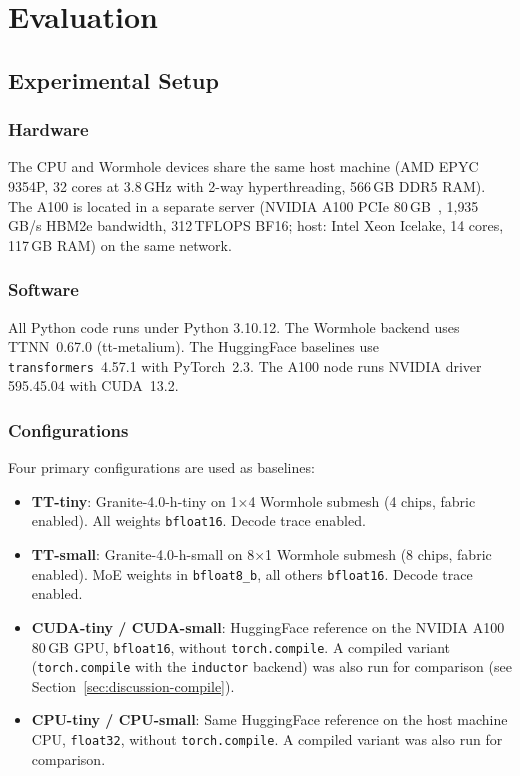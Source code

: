 \section{Evaluation}

\subsection{Experimental Setup}

\subsubsection{Hardware}

The CPU and Wormhole devices share the same host machine (AMD EPYC 9354P, 32 cores at 3.8\,GHz with 2-way hyperthreading, 566\,GB DDR5 RAM). The A100 is located in a separate server (NVIDIA A100 PCIe 80\,GB~\citep{nvidia2020a100}, 1{,}935\,GB/s HBM2e bandwidth, 312\,TFLOPS BF16; host: Intel Xeon Icelake, 14 cores, 117\,GB RAM) on the same network.

\subsubsection{Software}

All Python code runs under Python 3.10.12. The Wormhole backend uses TTNN~0.67.0 (tt-metalium). The HuggingFace baselines use \texttt{transformers}~4.57.1 with PyTorch~2.3. The A100 node runs NVIDIA driver 595.45.04 with CUDA~13.2.

\subsubsection{Configurations}

Four primary configurations are used as baselines:

\begin{itemize}
\item \textbf{TT-tiny}: Granite-4.0-h-tiny on 1$\times$4 Wormhole submesh (4 chips, fabric enabled). All weights \texttt{bfloat16}. Decode trace enabled.
\item \textbf{TT-small}: Granite-4.0-h-small on 8$\times$1 Wormhole submesh (8 chips, fabric enabled). MoE weights in \texttt{bfloat8\_b}, all others \texttt{bfloat16}. Decode trace enabled.
\item \textbf{CUDA-tiny / CUDA-small}: HuggingFace reference on the NVIDIA A100 80\,GB GPU, \texttt{bfloat16}, without \texttt{torch.compile}. A compiled variant (\texttt{torch.compile} with the \texttt{inductor} backend) was also run for comparison (see Section~\ref{sec:discussion-compile}).
\item \textbf{CPU-tiny / CPU-small}: Same HuggingFace reference on the host machine CPU, \texttt{float32}, without \texttt{torch.compile}. A compiled variant was also run for comparison.
\end{itemize}


